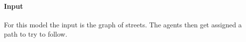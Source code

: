 \paragraph{Input}
\label{par:method:model:details:input}

For this model the input is the graph of streets. The agents then get assigned a path to try to follow. 


